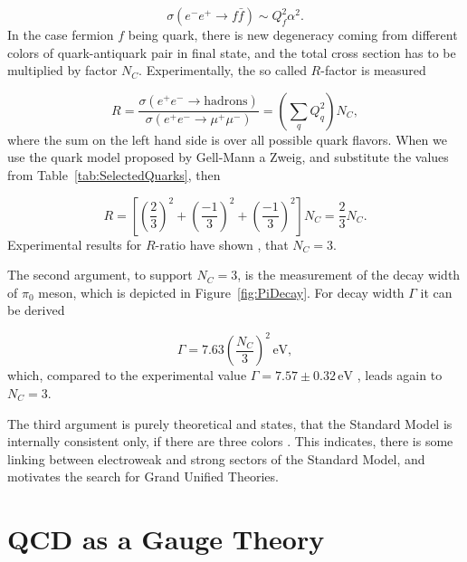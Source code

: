 \begin{equation}
  \sigma (e^- e^+ \rightarrow f \bar{f} ) \sim Q_f^2 \alpha^2.
  \label{eq:NumberOfColorsBasicCrossSection}
\end{equation}
In the case fermion $f$ being quark, there is new degeneracy coming from
different colors of quark-antiquark pair in final state, and the total cross
section has to be multiplied by factor $N_C$. Experimentally, the so called
$R$-factor is measured

\begin{equation}
  R = \frac{\sigma(e^+ e^- \rightarrow \text{hadrons})}{\sigma(e^+ e^-
  \rightarrow \mu^+ \mu^-)} = \left( \sum_q Q_q^2 \right) N_C,
  \label{eq:NumberOfColorsRatio}
\end{equation}
where the sum on the left hand side is over all possible quark flavors. When we
use the quark model proposed by Gell-Mann a Zweig, and substitute the values
from Table~\ref{tab:SelectedQuarks}, then

\begin{equation}
  R = \left[ \left( \frac{2}{3} \right)^2 +
    \left( \frac{-1}{3} \right)^2 +
  \left( \frac{-1}{3} \right)^2 \right] N_C = \frac{2}{3}N_C.
  \label{eq:NumberOfColorsSubstitued}
\end{equation}
Experimental results for $R$-ratio have shown \cite{PDG}, that $N_C = 3$.

The second argument, to support $N_C=3$, is the measurement of the decay width of
$\pi_0$ meson, which is depicted in Figure~\ref{fig:PiDecay}. For decay width
$\Gamma$ it can be derived 

\begin{equation}
  \Gamma = 7.63 \left( \frac{N_C}{3} \right)^2 \, \text{eV},
  \label{ex:PiMesonDecayWidth}
\end{equation}
which, compared to the experimental value $\Gamma = 7.57 \pm 0.32 \, \text{eV}$
\cite{PDG}, leads again to $N_C=3$.

The third argument is purely theoretical and states, that the Standard Model is
internally consistent only, if there are three colors \cite{QCDTextbook}. This
indicates, there is some linking between electroweak and strong sectors of
the Standard Model, and motivates the search for Grand Unified Theories.

\section{QCD as a Gauge Theory}

